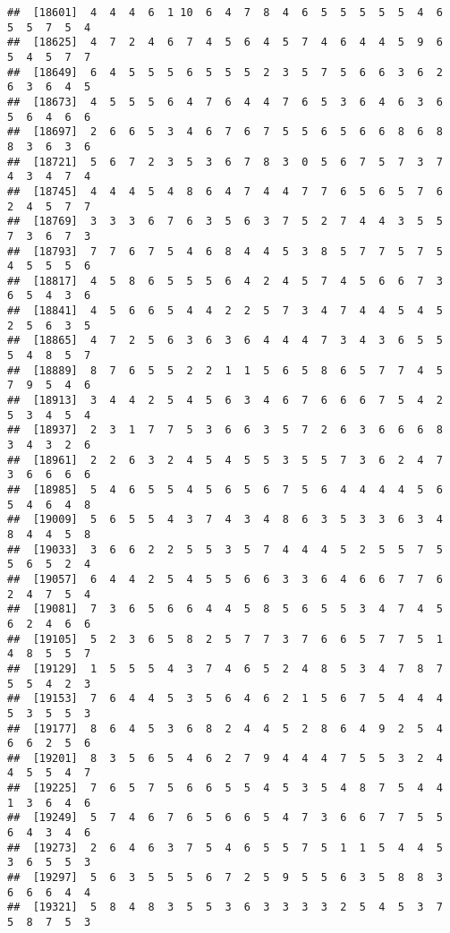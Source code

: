 \documentclass[
]{book}
\begin{document}
\begin{verbatim}
##  [18601]  4  4  4  6  1 10  6  4  7  8  4  6  5  5  5  5  5  4  6  5  5  7  5  4
##  [18625]  4  7  2  4  6  7  4  5  6  4  5  7  4  6  4  4  5  9  6  5  4  5  7  7
##  [18649]  6  4  5  5  5  6  5  5  5  2  3  5  7  5  6  6  3  6  2  6  3  6  4  5
##  [18673]  4  5  5  5  6  4  7  6  4  4  7  6  5  3  6  4  6  3  6  5  6  4  6  6
##  [18697]  2  6  6  5  3  4  6  7  6  7  5  5  6  5  6  6  8  6  8  8  3  6  3  6
##  [18721]  5  6  7  2  3  5  3  6  7  8  3  0  5  6  7  5  7  3  7  4  3  4  7  4
##  [18745]  4  4  4  5  4  8  6  4  7  4  4  7  7  6  5  6  5  7  6  2  4  5  7  7
##  [18769]  3  3  3  6  7  6  3  5  6  3  7  5  2  7  4  4  3  5  5  7  3  6  7  3
##  [18793]  7  7  6  7  5  4  6  8  4  4  5  3  8  5  7  7  5  7  5  4  5  5  5  6
##  [18817]  4  5  8  6  5  5  5  6  4  2  4  5  7  4  5  6  6  7  3  6  5  4  3  6
##  [18841]  4  5  6  6  5  4  4  2  2  5  7  3  4  7  4  4  5  4  5  2  5  6  3  5
##  [18865]  4  7  2  5  6  3  6  3  6  4  4  4  7  3  4  3  6  5  5  5  4  8  5  7
##  [18889]  8  7  6  5  5  2  2  1  1  5  6  5  8  6  5  7  7  4  5  7  9  5  4  6
##  [18913]  3  4  4  2  5  4  5  6  3  4  6  7  6  6  6  7  5  4  2  5  3  4  5  4
##  [18937]  2  3  1  7  7  5  3  6  6  3  5  7  2  6  3  6  6  6  8  3  4  3  2  6
##  [18961]  2  2  6  3  2  4  5  4  5  5  3  5  5  7  3  6  2  4  7  3  6  6  6  6
##  [18985]  5  4  6  5  5  4  5  6  5  6  7  5  6  4  4  4  4  5  6  5  4  6  4  8
##  [19009]  5  6  5  5  4  3  7  4  3  4  8  6  3  5  3  3  6  3  4  8  4  4  5  8
##  [19033]  3  6  6  2  2  5  5  3  5  7  4  4  4  5  2  5  5  7  5  5  6  5  2  4
##  [19057]  6  4  4  2  5  4  5  5  6  6  3  3  6  4  6  6  7  7  6  2  4  7  5  4
##  [19081]  7  3  6  5  6  6  4  4  5  8  5  6  5  5  3  4  7  4  5  6  2  4  6  6
##  [19105]  5  2  3  6  5  8  2  5  7  7  3  7  6  6  5  7  7  5  1  4  8  5  5  7
##  [19129]  1  5  5  5  4  3  7  4  6  5  2  4  8  5  3  4  7  8  7  5  5  4  2  3
##  [19153]  7  6  4  4  5  3  5  6  4  6  2  1  5  6  7  5  4  4  4  5  3  5  5  3
##  [19177]  8  6  4  5  3  6  8  2  4  4  5  2  8  6  4  9  2  5  4  6  6  2  5  6
##  [19201]  8  3  5  6  5  4  6  2  7  9  4  4  4  7  5  5  3  2  4  4  5  5  4  7
##  [19225]  7  6  5  7  5  6  6  5  5  4  5  3  5  4  8  7  5  4  4  1  3  6  4  6
##  [19249]  5  7  4  6  7  6  5  6  6  5  4  7  3  6  6  7  7  5  5  6  4  3  4  6
##  [19273]  2  6  4  6  3  7  5  4  6  5  5  7  5  1  1  5  4  4  5  3  6  5  5  3
##  [19297]  5  6  3  5  5  5  6  7  2  5  9  5  5  6  3  5  8  8  3  6  6  6  4  4
##  [19321]  5  8  4  8  3  5  5  3  6  3  3  3  3  2  5  4  5  3  7  5  8  7  5  3

\end{verbatim}
\end{document}
